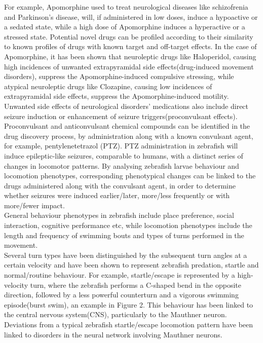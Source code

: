 \documentclass[a4paper,12pt]{article}
\begin{document}
For example, Apomorphine used to treat neurological diseases like schizofrenia\cite{ref12} and Parkinson's disease\cite{ref11}, will, if administered in low doses, induce a hypoactive or a sedated state, while a high dose of Apomorphine induces a hyperactive or a stressed state\cite{ref13}. Potential novel drugs can be profiled according to their similarity to known profiles of drugs with known target and off-target effects. In the case of Apomorphine, it has been shown that neuroleptic drugs like Haloperidol, causing high incidences of unwanted extrapyramidal side effects(drug-induced movement disorders), suppress the Apomorphine-induced compulsive stressing, while atypical neuroleptic drugs like Clozapine, causing low incidences of extrapyramidal side effects, suppress the Apomorphine-induced motility\cite{ref13}. \\Unwanted side effects of neurological disorders' medications also include direct seizure induction or enhancement of seizure triggers(proconvulsant effects). \\Proconvulsant and anticonvulsant chemical compounds can be identified in the drug discovery process, by administration along with a known convulsant agent, for example, pentylenetetrazol (PTZ). PTZ administration in zebrafish will induce epileptic-like seizures, comparable to humans, with a distinct series of changes in locomotor patterns\cite{ref14}. By analysing zebrafish larvae behaviour and locomotion phenotypes, corresponding phenotypical changes can be linked to the drugs administered along with the convulsant agent, in order to determine whether seizures were induced earlier/later, more/less frequently or with more/fewer impact\cite{ref16}\cite{ref20}. \\General behaviour phenotypes in zebrafish include place preference, social interaction, cognitive performance etc, while locomotion phenotypes include the length and frequency of swimming bouts and types of turns performed in the movement\cite{ref17}\cite{ref18}. \\Several turn types have been distinguished by the subsequent turn angles at a certain velocity and have been shown to represent zebrafish predation, startle and normal/routine behaviour\cite{ref9}. For example, startle/escape is represented by a high-velocity turn, where the zebrafish performs a C-shaped bend in the opposite direction, followed by a less powerful counterturn and a vigorous swimming episode(burst swim), an example in Figure 2. This behaviour has been linked to the central nervous system(CNS), particularly to the Mauthner neuron\cite{ref19}. Deviations from a typical zebrafish startle/escape locomotion pattern have been linked to disorders in the neural network involving Mauthner neurons\cite{ref21}.
\end{document}
